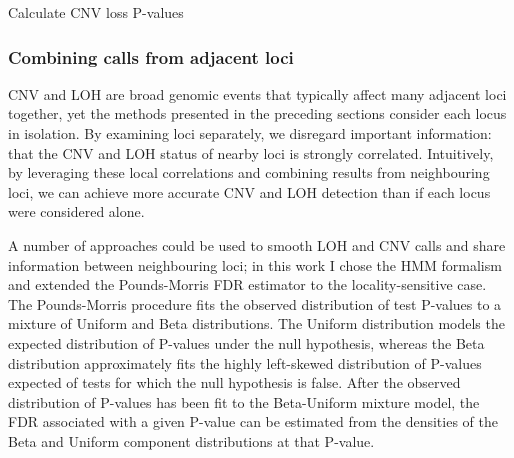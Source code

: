 \documentclass[dissertation.tex]{subfiles}
\begin{document}
\begin{algorithm}

  \label{alg:comp_find_cnv}
  \caption{Calculate \acrshort{CNV} loss P-values}
\end{algorithm}


\subsubsection{Combining calls from adjacent loci}

\Gls{CNV} and \gls{LOH} are broad genomic events that typically affect many adjacent loci together, yet the methods presented in the preceding sections consider each locus in isolation.  By examining loci separately, we disregard important information: that the \gls{CNV} and \gls{LOH} status of nearby loci is strongly correlated.  Intuitively, by leveraging these local correlations and combining results from neighbouring loci, we can achieve more accurate \gls{CNV} and \gls{LOH} detection than if each locus were considered alone.

A number of approaches could be used to smooth LOH and CNV calls and share information between neighbouring loci; in this work I chose the \gls{HMM} formalism and extended the Pounds-Morris FDR estimator\cite{Pounds2003} to the locality-sensitive case.  The Pounds-Morris procedure fits the observed distribution of test P-values to a mixture of Uniform and Beta distributions.  The Uniform distribution models the expected distribution of P-values under the null hypothesis, whereas the Beta distribution approximately fits the highly left-skewed distribution of P-values expected of tests for which the null hypothesis is false.  After the observed distribution of P-values has been fit to the Beta-Uniform mixture model, the \gls{FDR} associated with a given P-value can be estimated from the densities of the Beta and Uniform component distributions at that P-value.
\end{document}
